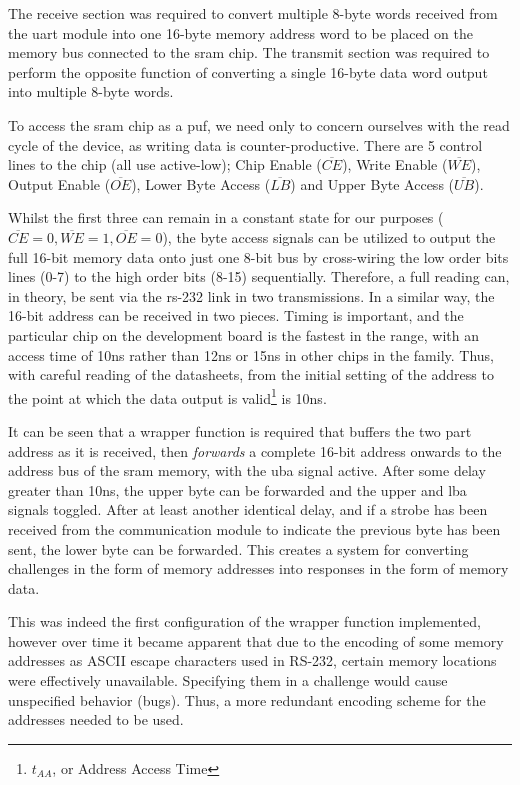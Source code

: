 The receive section was required to convert multiple 8-byte words received from the
\gls{uart} module into one 16-byte memory address word to be placed on the memory bus
connected to the \gls{sram} chip. The transmit section was required to perform the opposite function of
converting a single 16-byte data word output into multiple 8-byte words.

To access the \gls{sram} chip as a \gls{puf}, we need only to concern ourselves with
the read cycle of the device, as writing data is counter-productive.
There are 5 control lines to the chip (all
use active-low);
Chip Enable ($\overline{CE}$),
Write Enable ($\overline{WE}$),
Output Enable ($\overline{OE}$),
Lower Byte Access ($\overline{LB}$) and
Upper Byte Access ($\overline{UB}$).

Whilst the first three can remain in a constant state for our purposes
($\overline{CE} = 0, \overline{WE} = 1, \overline{OE} = 0$), the byte access signals
can be utilized to output the full 16-bit memory data onto just one 8-bit bus
by cross-wiring the low order bits lines (0-7) to the high order bits (8-15)
sequentially.
Therefore, a full reading can, in theory, be sent via the rs-232 link in two transmissions.
In a similar way, the 16-bit address can be received in two pieces.
Timing is important, and the particular chip on the development board is the
fastest in the range, with an access time of 10ns rather than 12ns or 15ns in
other chips in the family.
Thus, with careful reading of the datasheets\cite{sramdatasheet}, from
the initial setting of the address to the point at which the data output is
valid\footnote{$t_{AA}$, or Address Access Time} is 10ns.

It can be seen that a wrapper function is required that buffers the two part address
as it is received, then \emph{forwards} a complete 16-bit address onwards to
the address bus of the \gls{sram} memory, with the \gls{uba} signal active.
After some delay greater than 10ns, the upper byte can be forwarded and the
upper and \gls{lba} signals toggled. After at least another identical delay,
and if a strobe has been received from the communication module to indicate the previous
byte has been sent, the lower byte can be forwarded. This creates a system for
converting challenges in the form of memory addresses into responses in the form of
memory data.

This was indeed the first configuration of the wrapper function implemented, however over time
it became apparent that due to the encoding of some memory addresses as ASCII escape
characters used in RS-232, certain memory locations were effectively unavailable.
Specifying them in a challenge would cause unspecified behavior (bugs). Thus, a more redundant
encoding scheme for the addresses needed to be used.

